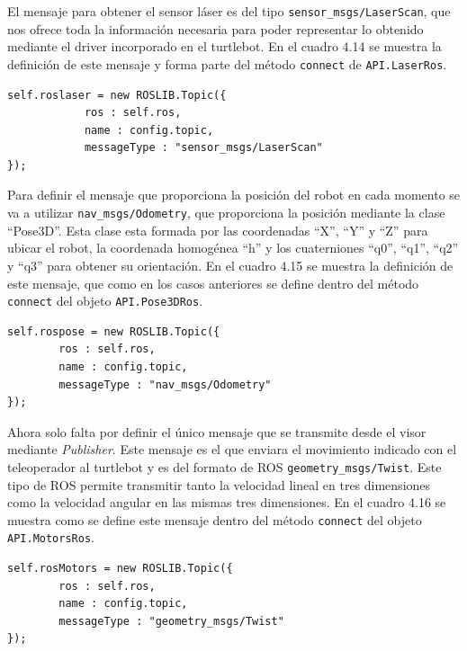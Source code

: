 El mensaje para obtener el sensor láser es del tipo \texttt{sensor\_msgs/LaserScan}, que nos ofrece toda la información necesaria para poder representar lo obtenido mediante el driver incorporado en el turtlebot. En el cuadro 4.14 se muestra la definición de este mensaje y forma parte del método \texttt{connect} de \texttt{API.LaserRos}.

\begin{lstlisting}[caption= Definición del mensaje para obtener la información del sensor láser, label=cod.mensajelaserturtle]
self.roslaser = new ROSLIB.Topic({
            ros : self.ros,
            name : config.topic,
            messageType : "sensor_msgs/LaserScan"
});
\end{lstlisting}

Para definir el mensaje que proporciona la posición del robot en cada momento se va a utilizar \texttt{nav\_msgs/Odometry}, que proporciona la posición mediante la clase ``Pose3D''. Esta clase esta formada por las coordenadas ``X'', ``Y'' y ``Z'' para ubicar el robot, la coordenada homogénea ``h'' y los cuaterniones ``q0'', ``q1'', ``q2'' y ``q3''  para obtener su orientación. En el cuadro 4.15 se muestra la definición de este mensaje, que como en los casos anteriores se define dentro del método \texttt{connect} del objeto \texttt{API.Pose3DRos}.

\begin{lstlisting}[caption= Definición del mensaje para obtener el posicionamiento del turtlebot, label=cod.mensajeposeturtle]
self.rospose = new ROSLIB.Topic({
		ros : self.ros,
		name : config.topic,
		messageType : "nav_msgs/Odometry"
});
\end{lstlisting}

Ahora solo falta por definir el único mensaje que se transmite desde el visor mediante \textit{Publisher}. Este mensaje es el que enviara el movimiento indicado con el teleoperador al turtlebot y es del formato de ROS \texttt{geometry\_msgs/Twist}. Este tipo de ROS permite transmitir tanto la velocidad lineal en tres dimensiones como la velocidad angular en las mismas tres dimensiones. En el cuadro 4.16 se muestra como se define este mensaje dentro del método \texttt{connect} del objeto \texttt{API.MotorsRos}.

\begin{lstlisting}[caption= Definición del mensaje para transmitir el movimiento proporcionado por el teleoperador, label=cod.mensajemotorturtle]
self.rosMotors = new ROSLIB.Topic({
		ros : self.ros,
		name : config.topic,
		messageType : "geometry_msgs/Twist"
});
\end{lstlisting}

